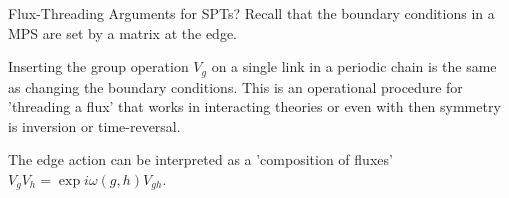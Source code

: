 \begin{frame}{Flux-Threading Arguments for SPTs?}
\vskip-1.5cm
Recall that the boundary conditions in a MPS are set by a matrix at the edge.

\begin{figure}[h]
    \centering
    \scalebox{1}{
    
    }
\end{figure}

Inserting the group operation $V_g$ on a single link in a periodic chain is the same as changing the boundary conditions. This is an operational procedure for 'threading a flux' that works in interacting theories or even with then symmetry is inversion or time-reversal.

The edge action can be interpreted as a 'composition of fluxes' $V_g V_h = \exp{i \omega(g, h)} V_{gh}$.
\end{frame}